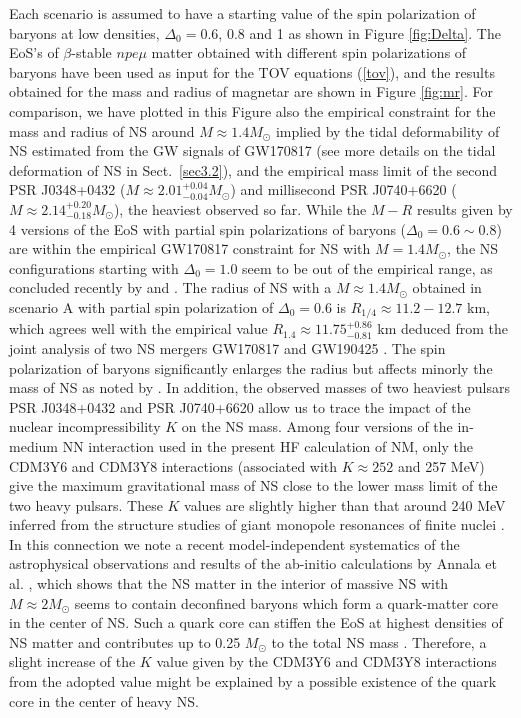 Each scenario is assumed to have a starting value of the spin polarization of baryons 
at low densities, $\Delta_0 = 0.6$, $0.8$ and 1 as shown in Figure \ref{fig:Delta}.
The EoS's of $\beta$-stable $npe\mu$ matter obtained with different spin polarizations of 
baryons have been used as input for the \gls{TOV} equations (\ref{tov}), and the results obtained 
for the mass and radius of magnetar are shown in Figure \ref{fig:mr}. For comparison, we
have plotted in this Figure also the empirical constraint for the mass and radius of \gls{NS} 
around $M\approx 1.4 M_\odot$ implied by the tidal deformability of \gls{NS} estimated from 
the \gls{GW} signals of GW170817 \citep{abbott2018gw170817} (see more details on the tidal 
deformation of \gls{NS} in Sect.~\ref{sec3.2}), and the empirical mass limit of the second 
\gls{PSR} J0348+0432 ($M\approx 2.01^{+0.04}_{-0.04}M_\odot$) and millisecond 
\gls{PSR} J0740+6620 ($M\approx 2.14^{+0.20}_{-0.18}M_\odot$), the heaviest  
observed so far. While the $M-R$ results given by 4 versions of the EoS with partial spin
polarizations of baryons ($\Delta_0 = 0.6\sim 0.8$) are within the empirical 
GW170817 constraint for \gls{NS} with $M=1.4M_\odot$, the \gls{NS} configurations starting with 
$\Delta_0 = 1.0$ seem to be out of the empirical range, as concluded recently 
by \cite{tan2020spin} and \cite{tews2020spin}. The radius of \gls{NS} with a 
$M\approx 1.4M_\odot$ obtained in scenario A with partial spin polarization 
of $\Delta_0 = 0.6$ is $R_{1/4}\approx 11.2 - 12.7$ km, which agrees well
with the empirical value $R_{1.4} \approx 11.75^{+0.86}_{-0.81}$ km deduced from 
the joint analysis of two \gls{NS} mergers GW170817 and GW190425 \citep{dietrich2020multimessenger}.
The spin polarization of baryons significantly enlarges the radius but affects minorly 
the mass of \gls{NS} as noted by \cite{tan2020spin}. In addition, the observed masses of two 
heaviest pulsars \gls{PSR} J0348+0432 and \gls{PSR} J0740+6620 allow us to trace the impact 
of the nuclear incompressibility $K$ on the \gls{NS} mass. Among four versions of the in-medium 
NN interaction used in the present HF calculation of NM, only the CDM3Y6 
and CDM3Y8 interactions (associated with $K\approx 252$ and 257 MeV) give the maximum 
gravitational mass of \gls{NS} close to the lower mass limit of the two heavy pulsars. These 
$K$ values are slightly higher than that around 240 MeV inferred from the structure studies 
of giant monopole resonances of finite nuclei \cite{garg2018compression}. In this connection we note 
a recent model-independent systematics of the astrophysical observations and results of the
ab-initio calculations by Annala et al. \cite{annala2020evidence}, which shows that the \gls{NS} 
matter in the interior of massive \gls{NS} with $M\approx 2M_\odot$ seems to contain deconfined 
baryons which form a quark-matter core in the center of \gls{NS}. Such a quark core can stiffen 
the EoS at highest densities of \gls{NS} matter and contributes up to 0.25 $M_\odot$ to the 
total \gls{NS} mass  \cite{annala2020evidence}. Therefore, a slight increase of the $K$ value given 
by the CDM3Y6 and CDM3Y8 interactions from the adopted value might be explained 
by a possible existence of the quark core in the center of heavy \gls{NS}.  

